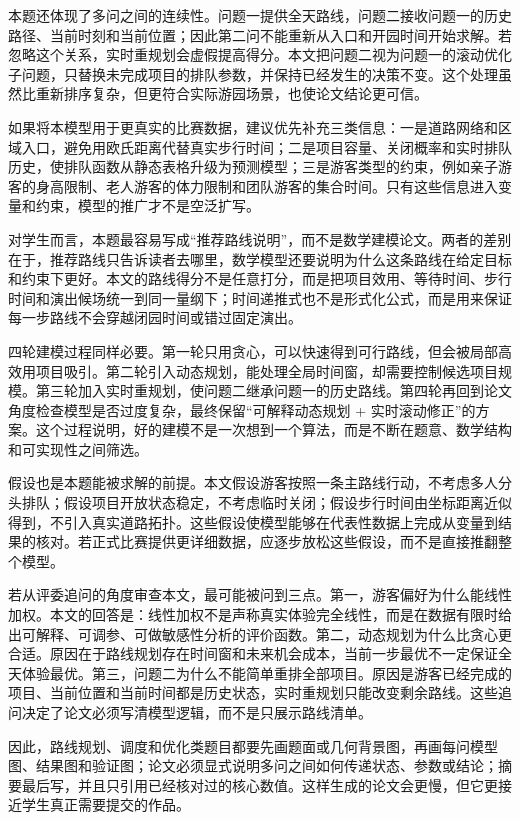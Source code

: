\documentclass[UTF8,12pt,a4paper]{ctexart}
\begin{document}
本题还体现了多问之间的连续性。问题一提供全天路线，问题二接收问题一的历史路径、当前时刻和当前位置；因此第二问不能重新从入口和开园时间开始求解。若忽略这个关系，实时重规划会虚假提高得分。本文把问题二视为问题一的滚动优化子问题，只替换未完成项目的排队参数，并保持已经发生的决策不变。这个处理虽然比重新排序复杂，但更符合实际游园场景，也使论文结论更可信。

如果将本模型用于更真实的比赛数据，建议优先补充三类信息：一是道路网络和区域入口，避免用欧氏距离代替真实步行时间；二是项目容量、关闭概率和实时排队历史，使排队函数从静态表格升级为预测模型；三是游客类型的约束，例如亲子游客的身高限制、老人游客的体力限制和团队游客的集合时间。只有这些信息进入变量和约束，模型的推广才不是空泛扩写。

对学生而言，本题最容易写成“推荐路线说明”，而不是数学建模论文。两者的差别在于，推荐路线只告诉读者去哪里，数学模型还要说明为什么这条路线在给定目标和约束下更好。本文的路线得分不是任意打分，而是把项目效用、等待时间、步行时间和演出候场统一到同一量纲下；时间递推式也不是形式化公式，而是用来保证每一步路线不会穿越闭园时间或错过固定演出。

四轮建模过程同样必要。第一轮只用贪心，可以快速得到可行路线，但会被局部高效用项目吸引。第二轮引入动态规划，能处理全局时间窗，却需要控制候选项目规模。第三轮加入实时重规划，使问题二继承问题一的历史路线。第四轮再回到论文角度检查模型是否过度复杂，最终保留“可解释动态规划 + 实时滚动修正”的方案。这个过程说明，好的建模不是一次想到一个算法，而是不断在题意、数学结构和可实现性之间筛选。

假设也是本题能被求解的前提。本文假设游客按照一条主路线行动，不考虑多人分头排队；假设项目开放状态稳定，不考虑临时关闭；假设步行时间由坐标距离近似得到，不引入真实道路拓扑。这些假设使模型能够在代表性数据上完成从变量到结果的核对。若正式比赛提供更详细数据，应逐步放松这些假设，而不是直接推翻整个模型。

若从评委追问的角度审查本文，最可能被问到三点。第一，游客偏好为什么能线性加权。本文的回答是：线性加权不是声称真实体验完全线性，而是在数据有限时给出可解释、可调参、可做敏感性分析的评价函数。第二，动态规划为什么比贪心更合适。原因在于路线规划存在时间窗和未来机会成本，当前一步最优不一定保证全天体验最优。第三，问题二为什么不能简单重排全部项目。原因是游客已经完成的项目、当前位置和当前时间都是历史状态，实时重规划只能改变剩余路线。这些追问决定了论文必须写清模型逻辑，而不是只展示路线清单。

因此，路线规划、调度和优化类题目都要先画题面或几何背景图，再画每问模型图、结果图和验证图；论文必须显式说明多问之间如何传递状态、参数或结论；摘要最后写，并且只引用已经核对过的核心数值。这样生成的论文会更慢，但它更接近学生真正需要提交的作品。
\end{document}
